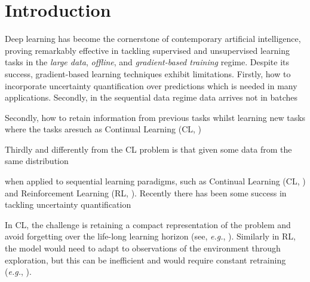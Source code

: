 \documentclass{article}
\makeatletter
\newcommand{\eg}{\textit{e.g.\@}\xspace}
\makeatother
\begin{document}

\section{Introduction}
\label{sec:intro}
%
Deep learning has become the cornerstone of contemporary artificial intelligence, proving remarkably effective in tackling supervised and unsupervised learning tasks in the {\em large data}, {\em offline}, and {\em gradient-based training} regime. Despite its success, gradient-based learning techniques exhibit limitations. Firstly, how to incorporate uncertainty quantification over predictions which is needed in many applications. Secondly, in the sequential data regime data arrives not in batches 

Secondly, how to retain information from previous tasks whilst learning new tasks where the tasks aresuch as Continual Learning (CL, \cite{de2021continual})

Thirdly and differently from the CL problem is that given some data from the same distribution 

when applied to sequential learning paradigms, such as Continual Learning (CL, \cite{mccloskey1989catastrophic}) and Reinforcement Learning (RL, \cite{sutton2018reinforcement}). Recently there has been some success in tackling uncertainty quantification

In CL, the challenge is retaining a compact representation of the problem and avoid forgetting over the life-long learning horizon (see, \eg, \cite{add}). Similarly in RL, the model would need to adapt to observations of the environment through exploration, but this can be inefficient and would require constant retraining (\eg, \cite{add, add}).
\end{document}
